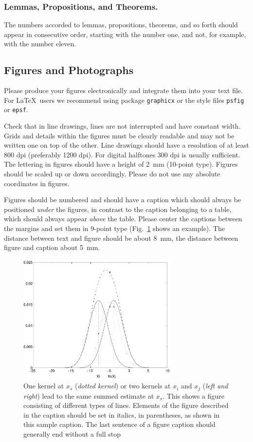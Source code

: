 \documentclass[runningheads]{llncs}
\begin{document}
\subsubsection{Lemmas, Propositions, and Theorems.}

The numbers accorded to lemmas, propositions, theorems, and so forth should
appear in consecutive order, starting with the number one, and not, for
example, with the number eleven.

\subsection{Figures and Photographs}
\label{sect:figures}

Please produce your figures electronically and integrate
them into your text file. For \LaTeX\ users we recommend using package
\verb+graphicx+ or the style files \verb+psfig+ or \verb+epsf+.

Check that in line drawings, lines are not
interrupted and have constant width. Grids and details within the
figures must be clearly readable and may not be written one on top of
the other. Line drawings should have a resolution of at least 800 dpi
(preferably 1200 dpi).
For digital halftones 300 dpi is usually sufficient.
The lettering in figures should have a height of 2~mm (10-point type).
Figures should be scaled up or down accordingly.
Please do not use any absolute coordinates in figures.

Figures should be numbered and should have a caption which should
always be positioned {\it under} the figures, in contrast to the caption
belonging to a table, which should always appear {\it above} the table.
Please center the captions between the margins and set them in
9-point type
(Fig.~\ref{fig:example} shows an example).
The distance between text and figure should be about 8~mm, the
distance between figure and caption about 5~mm.
\begin{figure}
	\centering
	\includegraphics[height=6.5cm]{eijkel2}
	\caption{One kernel at $x_s$ ({\it dotted kernel}) or two kernels at
		$x_i$ and $x_j$ ({\it left and right}) lead to the same summed estimate
		at $x_s$. This shows a figure consisting of different types of
		lines. Elements of the figure described in the caption should be set in
		italics,
		in parentheses, as shown in this sample caption. The last
		sentence of a figure caption should generally end without a full stop}
	\label{fig:example}
\end{figure}
\end{document}
